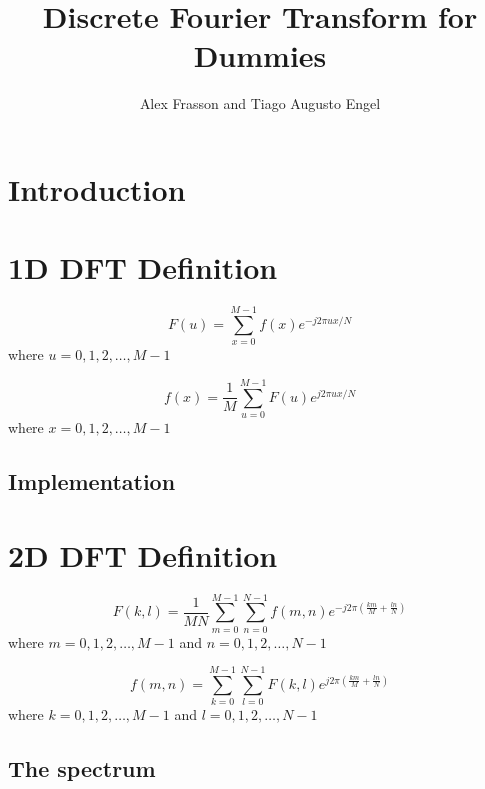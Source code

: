 \documentclass[12pt]{article}
\title{Discrete Fourier Transform for Dummies}
\author{Alex Frasson and Tiago Augusto Engel\inst{1}}
\begin{document}
 
\maketitle

\section{Introduction}

\section{1D DFT Definition}
\begin{equation}
F(u)=\sum_{x=0}^{M-1}f(x) e^{-j 2\pi u x / N}
\end{equation}
where $u = 0,1,2,\dots, M-1$

\begin{equation}
f(x)=\frac{1}{M}\sum_{u=0}^{M-1}F(u) e^{j 2\pi u x / N}
\end{equation}
where $x = 0,1,2,\dots, M-1$

\subsection{Implementation}

\section{2D DFT Definition}
\begin{equation}
F(k,l)=\frac{1}{MN}\sum_{m=0}^{M-1}\sum_{n=0}^{N-1} f(m,n) e^{-j 2\pi (\frac{km}{M} + \frac{ln}{N})}
\end{equation}
where $m = 0,1,2,\dots, M-1$ and $n = 0,1,2,\dots, N-1$

\begin{equation}
f(m,n)=\sum_{k=0}^{M-1}\sum_{l=0}^{N-1} F(k,l) e^{j 2\pi (\frac{km}{M} + \frac{ln}{N})}
\end{equation}
where $k = 0,1,2,\dots, M-1$ and $l = 0,1,2,\dots, N-1$

\subsection{The spectrum}




\end{document}
